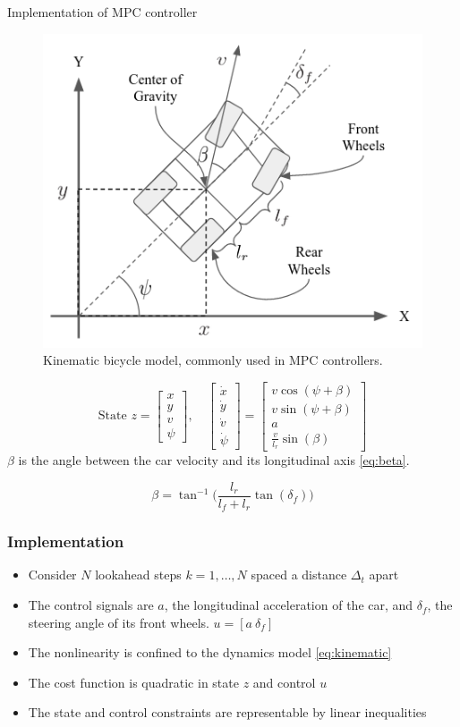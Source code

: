 \documentclass{beamer}
\begin{document}
\begin{frame}{Implementation of MPC controller}
\begin{figure}
	\includegraphics[width=0.38\linewidth]{kinematic_diagram.png}
	\caption{Kinematic bicycle model, commonly used in MPC controllers.}
\end{figure}
\vspace{-0.5em}
\begin{equation}
\text{State } z = \begin{bmatrix}
x\\y\\v\\\psi
\end{bmatrix},\quad \begin{bmatrix}
\dot x\\\dot y\\\dot v\\\dot\psi
\end{bmatrix} = \begin{bmatrix}
v\cos(\psi + \beta)\\
v\sin(\psi + \beta)\\
a\\
\frac{v}{l_r}\sin(\beta)
\end{bmatrix}
\label{eq:kinematic}
\end{equation}
$\beta$ is the angle between the car velocity and its longitudinal axis \eqref{eq:beta}.

\begin{equation}
\beta = \tan^{-1}\Big( \frac{l_r}{l_f + l_r}\tan(\delta_f) \Big)
\label{eq:beta}
\end{equation}
\end{frame}

\begin{frame}
\frametitle{Implementation}
\begin{itemize}
\item Consider $N$ lookahead steps $k=1,\dots,N$ spaced a distance $\Delta_t$ apart
\item The control signals are $a$, the longitudinal acceleration of the car, and $\delta_f$, the steering angle of its front wheels. $u = [a\ \delta_f]$
\item The nonlinearity is confined to the dynamics model \eqref{eq:kinematic}
\item The cost function is quadratic in state $z$ and control $u$
\item The state and control constraints are representable by linear inequalities
\end{itemize}
\end{frame}
\end{document}

